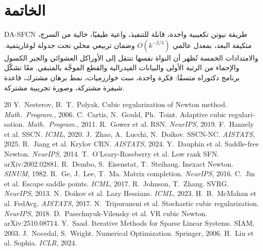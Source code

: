 \documentclass[12pt,a4paper]{article}
\theoremstyle{definition}
\begin{document}
\section{الخاتمة}
\textenglish{DA-SFCN} طريقة نيوتن تكعيبية واحدة، قابلة للتنفيذ، واعية
طيفيًا، خالية من السرج، متكيفة البعد، بمعدل عالمي $O(k^{-2/3})$ وضمان
تربيعي محلي تحت جدولة لوغاريتمية. والامتدادات الخمسة تُظهر أن النواة نفسها
تنتقل إلى الأوراكل العشوائي والجبر الكسول والإحماء من الرتبة الأولى
والبيانات الفيدرالية والقطع الموجَّه بالمتبقي. معًا تشكّل برنامج دكتوراه
متسقًا: فكرة واحدة، ست خوارزميات، نمط برهان مشترك، قاعدة شيفرة مشتركة،
وصورة تجريبية مشتركة.

\begin{english}
\begin{thebibliography}{20}
 Y.~Nesterov, B.~T.~Polyak. Cubic regularization of
Newton method. \textit{Math.\ Program.}, 2006.
 C.~Cartis, N.~Gould, Ph.~Toint. Adaptive cubic
regularisation. \textit{Math.\ Program.}, 2011.
 R.~Gower et al. RSN. \textit{NeurIPS}, 2019.
 F.~Hanzely et al. SSCN. \textit{ICML}, 2020.
 J.~Zhao, A.~Lucchi, N.~Doikov. SSCN-NC. \textit{AISTATS}, 2025.
 R.~Jiang et al. Krylov CRN. \textit{AISTATS}, 2024.
 Y.~Dauphin et al. Saddle-free Newton. \textit{NeurIPS}, 2014.
 T.~O'Leary-Roseberry et al. Low rank SFN. arXiv:2002.02881.
 R.~Dembo, S.~Eisenstat, T.~Steihaug. Inexact Newton. \textit{SINUM}, 1982.
 R.~Ge, J.~Lee, T.~Ma. Matrix completion. \textit{NeurIPS}, 2016.
 C.~Jin et al. Escape saddle points. \textit{ICML}, 2017.
 R.~Johnson, T.~Zhang. SVRG. \textit{NeurIPS}, 2013.
 N.~Doikov et al. Lazy Hessians. \textit{ICML}, 2023.
 H.~B.~McMahan et al. FedAvg. \textit{AISTATS}, 2017.
 N.~Tripuraneni et al. Stochastic cubic regularization. \textit{NeurIPS}, 2018.
 D.~Pasechnyuk-Vilensky et al. VR cubic Newton. arXiv:2510.08714.
 Y.~Saad. Iterative Methods for Sparse Linear Systems. SIAM, 2003.
 J.~Nocedal, S.~Wright. Numerical Optimization. Springer, 2006.
 H.~Liu et al. Sophia. \textit{ICLR}, 2024.
\end{thebibliography}
\end{english}
\end{document}
